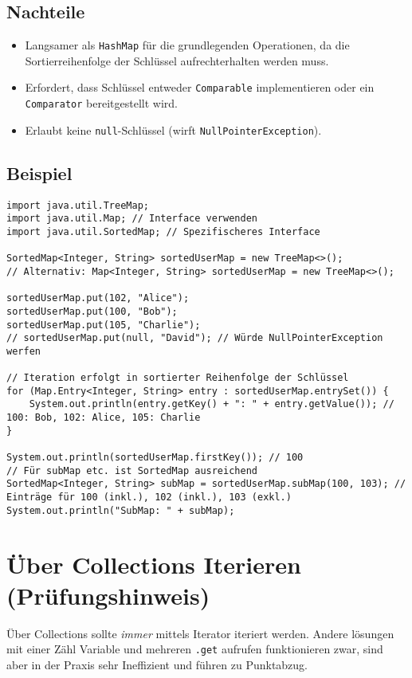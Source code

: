 \subsection{Nachteile}
\begin{itemize}
    \item Langsamer als \texttt{HashMap} für die grundlegenden Operationen, da die Sortierreihenfolge der Schlüssel aufrechterhalten werden muss.
    \item Erfordert, dass Schlüssel entweder \texttt{Comparable} implementieren oder ein \texttt{Comparator} bereitgestellt wird.
    \item Erlaubt keine \texttt{null}-Schlüssel (wirft \texttt{NullPointerException}).
\end{itemize}

\subsection{Beispiel}
\begin{lstlisting}[caption={Beispiel für die Verwendung einer TreeMap in Java}, label=lst:treeMapExample]
import java.util.TreeMap;
import java.util.Map; // Interface verwenden
import java.util.SortedMap; // Spezifischeres Interface

SortedMap<Integer, String> sortedUserMap = new TreeMap<>();
// Alternativ: Map<Integer, String> sortedUserMap = new TreeMap<>();

sortedUserMap.put(102, "Alice");
sortedUserMap.put(100, "Bob");
sortedUserMap.put(105, "Charlie");
// sortedUserMap.put(null, "David"); // Würde NullPointerException werfen

// Iteration erfolgt in sortierter Reihenfolge der Schlüssel
for (Map.Entry<Integer, String> entry : sortedUserMap.entrySet()) {
    System.out.println(entry.getKey() + ": " + entry.getValue()); // 100: Bob, 102: Alice, 105: Charlie
}

System.out.println(sortedUserMap.firstKey()); // 100
// Für subMap etc. ist SortedMap ausreichend
SortedMap<Integer, String> subMap = sortedUserMap.subMap(100, 103); // Einträge für 100 (inkl.), 102 (inkl.), 103 (exkl.)
System.out.println("SubMap: " + subMap);
\end{lstlisting}

\section{Über Collections Iterieren (Prüfungshinweis)}
Über Collections sollte \textit{immer} mittels Iterator iteriert werden. Andere lösungen mit einer Zähl Variable und mehreren \lstinline{.get} aufrufen funktionieren zwar, sind aber in der Praxis sehr Ineffizient und führen zu Punktabzug.